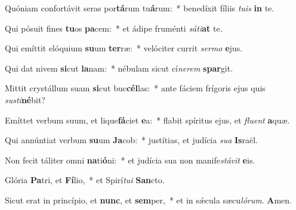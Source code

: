 \item Quóniam confortávit seras por\textbf{tá}rum tu\textbf{á}rum:~* benedíxit fíliis \textit{tu}\textit{is} \textbf{in} te.
\item Qui pósuit fines \textbf{tu}os \textbf{pa}cem:~* et ádipe fruménti \textit{sá}\textit{ti}\textbf{at} te.
\item Qui emíttit elóquium \textbf{su}um \textbf{ter}ræ:~* velóciter currit \textit{ser}\textit{mo} \textbf{e}jus.
\item Qui dat nivem \textbf{si}cut \textbf{la}nam:~* nébulam sicut cí\textit{ne}\textit{rem} \textbf{spar}git.
\item Mittit crystállum suam \textbf{si}cut buc\textbf{cél}las:~* ante fáciem frígoris ejus quis \textit{su}\textit{sti}\textbf{né}bit?
\item Emíttet verbum suum, et lique\textbf{fá}ciet \textbf{e}a:~* flabit spíritus ejus, et \textit{flu}\textit{ent} \textbf{a}quæ.
\item Qui annúntiat verbum \textbf{su}um \textbf{Ja}cob:~* justítias, et judícia \textit{su}\textit{a} \textbf{Is}raël.
\item Non fecit táliter omni \textbf{na}ti\textbf{ó}ni:~* et judícia sua non manife\textit{stá}\textit{vit} \textbf{e}is.
\item Glória \textbf{Pa}tri, et \textbf{Fí}lio,~* et Spirí\textit{tu}\textit{i} \textbf{San}cto.
\item Sicut erat in princípio, et \textbf{nunc}, et \textbf{sem}per,~* et in sǽcula sæcu\textit{ló}\textit{rum}. \textbf{A}men.
